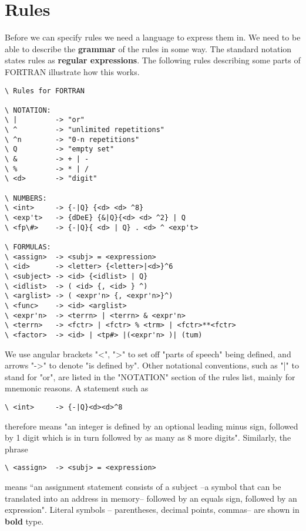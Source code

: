 \section{Rules}
Before we can specify rules we need a language to express them in. We need to be able to describe the \textbf{grammar} of the rules in some way. The standard notation states rules as \textbf{regular expressions}. The following rules describing some parts of FORTRAN illustrate how this works.

\begin{verbatim}
\ Rules for FORTRAN

\ NOTATION:
\ |         -> "or"
\ ^         -> "unlimited repetitions"
\ ^n        -> "0-n repetitions"
\ Q         -> "empty set"
\ &         -> + | -
\ %         -> * | /
\ <d>       -> "digit"

\ NUMBERS:
\ <int>     -> {-|Q} {<d> <d> ^8}
\ <exp't>   -> {dDeE} {&|Q}{<d> <d> ^2} | Q
\ <fp\#>    -> {-|Q}{ <d> | Q} . <d> ^ <exp't>

\ FORMULAS:
\ <assign>  -> <subj> = <expression>
\ <id>      -> <letter> {<letter>|<d>}^6
\ <subject> -> <id> {<idlist> | Q}
\ <idlist>  -> ( <id> {, <id> } ^)
\ <arglist> -> ( <expr'n> {, <expr'n>}^)
\ <func>    -> <id> <arglist>
\ <expr'n>  -> <terrn> | <terrn> & <expr'n>
\ <terrn>   -> <fctr> | <fctr> % <trm> | <fctr>**<fctr>
\ <factor>  -> <id> | <tp#> |(<expr'n> )| (tum)

\end{verbatim}

We use angular brackets "<", ">" to set off "parts of speech" being defined, and arrows "->" to denote "is defined by". Other notational conventions, such as "|" to stand for "or", are listed in the "NOTATION" section of the rules list, mainly for mnemonic reasons. A statement such as

\begin{verbatim}
\ <int>     -> {-|Q}<d><d>^8
\end{verbatim}

therefore means "an integer is defined by an optional leading minus sign, followed by 1 digit which is in turn followed by as many as 8 more digits". Similarly, the phrase

\begin{verbatim}
\ <assign>  -> <subj> = <expression>
\end{verbatim}

means “an assignment statement consists of a subject --a symbol that can be translated into an address in memory-- followed by an equals sign, followed by an expression". Literal symbols -- parentheses, decimal points, commas-- are shown in \textbf{bold} type.

